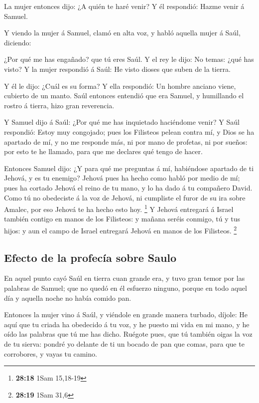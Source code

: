  La mujer entonces dijo: ¿A quién te haré venir? Y él
respondió: Hazme venir á Samuel.

 Y viendo la mujer á Samuel, clamó en alta voz, y habló
aquella mujer á Saúl, diciendo:

 ¿Por qué me has engañado? que tú eres Saúl. Y el rey le
dijo: No temas: ¿qué has visto? Y la mujer respondió á Saúl: He visto
dioses que suben de la tierra.

 Y él le dijo: ¿Cuál es su forma? Y ella respondió: Un
hombre anciano viene, cubierto de un manto. Saúl entonces entendió que
era Samuel, y humillando el rostro á tierra, hizo gran reverencia.

 Y Samuel dijo á Saúl: ¿Por qué me has inquietado
haciéndome venir? Y Saúl respondió: Estoy muy congojado; pues los
Filisteos pelean contra mí, y Dios se ha apartado de mí, y no me
responde más, ni por mano de profetas, ni por sueños: por esto te he
llamado, para que me declares qué tengo de hacer.

 Entonces Samuel dijo: ¿Y para qué me preguntas á mí,
habiéndose apartado de ti Jehová, y es tu enemigo?  Jehová
pues ha hecho como habló por medio de mí; pues ha cortado Jehová el
reino de tu mano, y lo ha dado á tu compañero David.  Como
tú no obedeciste á la voz de Jehová, ni cumpliste el furor de su ira
sobre Amalec, por eso Jehová te ha hecho esto hoy. \footnote{\textbf{28:18}
  1Sam 15,18-19}  Y Jehová entregará á Israel también
contigo en manos de los Filisteos: y mañana seréis conmigo, tú y tus
hijos: y aun el campo de Israel entregará Jehová en manos de los
Filisteos. \footnote{\textbf{28:19} 1Sam 31,6}

\hypertarget{efecto-de-la-profecuxeda-sobre-saulo}{%
\subsection{Efecto de la profecía sobre
Saulo}\label{efecto-de-la-profecuxeda-sobre-saulo}}

 En aquel punto cayó Saúl en tierra cuan grande era, y tuvo
gran temor por las palabras de Samuel; que no quedó en él esfuerzo
ninguno, porque en todo aquel día y aquella noche no había comido pan.

 Entonces la mujer vino á Saúl, y viéndole en grande manera
turbado, díjole: He aquí que tu criada ha obedecido á tu voz, y he
puesto mi vida en mi mano, y he oído las palabras que tú me has dicho.
 Ruégote pues, que tú también oigas la voz de tu sierva:
pondré yo delante de ti un bocado de pan que comas, para que te
corrobores, y vayas tu camino.

